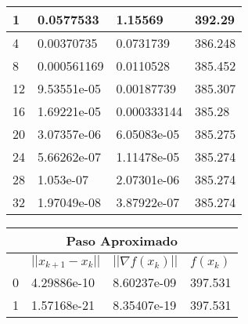 \documentclass{article}
\begin{document}
\begin{enumerate}
\begin{table}[h]
{\begin{tabular}{llll}
  \multicolumn{1}{|l|}{1} & \multicolumn{1}{l|}{0.0577533}  & \multicolumn{1}{l|}{1.15569}  & \multicolumn{1}{l|}{392.29} \\ \hline
  \multicolumn{1}{|l|}{4} & \multicolumn{1}{l|}{0.00370735} & \multicolumn{1}{l|}{0.0731739}  & \multicolumn{1}{l|}{386.248} \\ \hline
  \multicolumn{1}{|l|}{8} & \multicolumn{1}{l|}{0.000561169}  & \multicolumn{1}{l|}{0.0110528}  & \multicolumn{1}{l|}{385.452} \\ \hline
  \multicolumn{1}{|l|}{12}  & \multicolumn{1}{l|}{9.53551e-05}  & \multicolumn{1}{l|}{0.00187739} & \multicolumn{1}{l|}{385.307} \\ \hline
  \multicolumn{1}{|l|}{16}  & \multicolumn{1}{l|}{1.69221e-05}  & \multicolumn{1}{l|}{0.000333144}  &\multicolumn{1}{l|}{385.28} \\ \hline
  \multicolumn{1}{|l|}{20}  & \multicolumn{1}{l|}{3.07357e-06}  & \multicolumn{1}{l|}{6.05083e-05}  &\multicolumn{1}{l|}{385.275} \\ \hline
  \multicolumn{1}{|l|}{24}  & \multicolumn{1}{l|}{5.66262e-07}  & \multicolumn{1}{l|}{1.11478e-05}  &\multicolumn{1}{l|}{385.274} \\ \hline
  \multicolumn{1}{|l|}{28}  & \multicolumn{1}{l|}{1.053e-07}  & \multicolumn{1}{l|}{2.07301e-06}  & \multicolumn{1}{l|}{385.274} \\ \hline
  \multicolumn{1}{|l|}{32}  & \multicolumn{1}{l|}{1.97049e-08}  & \multicolumn{1}{l|}{3.87922e-07}  &\multicolumn{1}{l|}{385.274} \\ \hline
  \end{tabular}
  \begin{tabular}{llll}
  \multicolumn{4}{c}{Paso Aproximado} \\ \hline
  \rowcolor[HTML]{DBDBDB} 
  \multicolumn{1}{|l|}{\cellcolor[HTML]{DBDBDB}k} & \multicolumn{1}{l|}{\cellcolor[HTML]{DBDBDB}$||x_{k+1} - x_k||$} & \multicolumn{1}{l|}{\cellcolor[HTML]{DBDBDB}$||\nabla f (x_k )||$}       & \multicolumn{1}{l|}{\cellcolor[HTML]{DBDBDB}$f(x_k)$} \\ \hline
  \multicolumn{1}{|l|}{0} & \multicolumn{1}{l|}{4.29886e-10}  & \multicolumn{1}{l|}{8.60237e-09}  & \multicolumn{1}{l|}{397.531} \\ \hline
  \multicolumn{1}{|l|}{1} & \multicolumn{1}{l|}{1.57168e-21}  & \multicolumn{1}{l|}{8.35407e-19}  & \multicolumn{1}{l|}{397.531} \\ \hline


\end{tabular}}
\end{table}
\end{enumerate}
\end{document}
